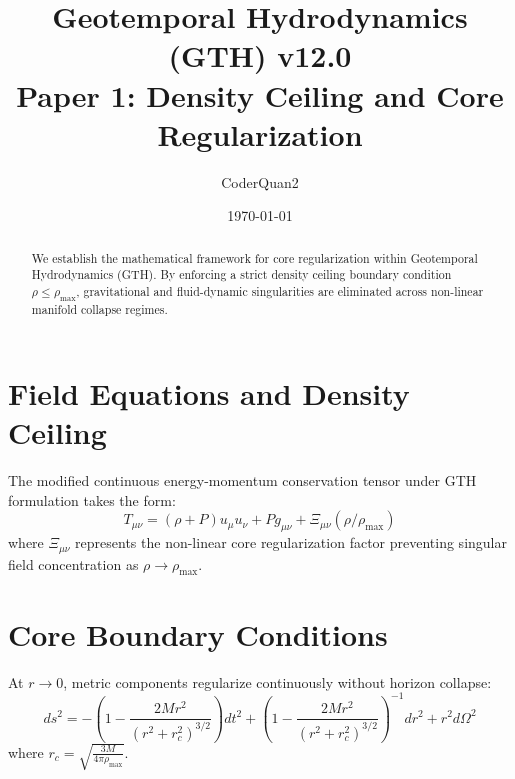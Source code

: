 \documentclass[11pt,a4paper]{article}
\title{\textbf{Geotemporal Hydrodynamics (GTH) v12.0\\Paper 1: Density Ceiling and Core Regularization}}
\author{CoderQuan2}
\date{\today}
\begin{document}
\maketitle
\begin{abstract}
We establish the mathematical framework for core regularization within Geotemporal Hydrodynamics (GTH). By enforcing a strict density ceiling boundary condition $\rho \le \rho_{\max}$, gravitational and fluid-dynamic singularities are eliminated across non-linear manifold collapse regimes.
\end{abstract}
\section{Field Equations and Density Ceiling}
The modified continuous energy-momentum conservation tensor under GTH formulation takes the form:
\begin{equation}
T_{\mu\nu} = (\rho + P) u_\mu u_\nu + P g_{\mu\nu} + \Xi_{\mu\nu}(\rho/\rho_{\max})
\end{equation}
where $\Xi_{\mu\nu}$ represents the non-linear core regularization factor preventing singular field concentration as $\rho \to \rho_{\max}$.
\section{Core Boundary Conditions}
At $r \to 0$, metric components regularize continuously without horizon collapse:
\begin{equation}
ds^2 = - \left(1 - \frac{2M r^2}{(r^2 + r_c^2)^{3/2}}\right) dt^2 + \left(1 - \frac{2M r^2}{(r^2 + r_c^2)^{3/2}}\right)^{-1} dr^2 + r^2 d\Omega^2
\end{equation}
where $r_c = \sqrt{\frac{3M}{4\pi \rho_{\max}}}$.
\end{document}
